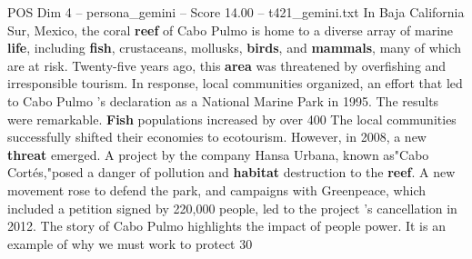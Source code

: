 \begin{textsample}{POS Dim 4 – persona\_gemini – Score 14.00 – t421\_gemini.txt}  \label{ex:f4_pos_049}
In Baja California Sur, Mexico, the coral \textbf{reef} of Cabo Pulmo is home to a diverse array of marine \textbf{life}, including \textbf{fish}, crustaceans, mollusks, \textbf{birds}, and \textbf{mammals}, many of which are at risk.
Twenty-five years ago, this \textbf{area} was threatened by overfishing and irresponsible tourism.
In response, local communities organized, an effort that led to Cabo Pulmo ’s declaration as a National Marine Park in 1995.
The results were remarkable. \textbf{Fish} populations increased by over 400 %
The local communities successfully shifted their economies to ecotourism.
However, in 2008, a new \textbf{threat} emerged.
A project by the company Hansa Urbana, known as"Cabo Cortés,"posed a danger of pollution and \textbf{habitat} destruction to the \textbf{reef}.
A new movement rose to defend the park, and campaigns with Greenpeace, which included a petition signed by 220,000 people, led to the project 's cancellation in 2012.
The story of Cabo Pulmo highlights the impact of people power.
It is an example of why we must work to protect 30 %

\end{textsample}
